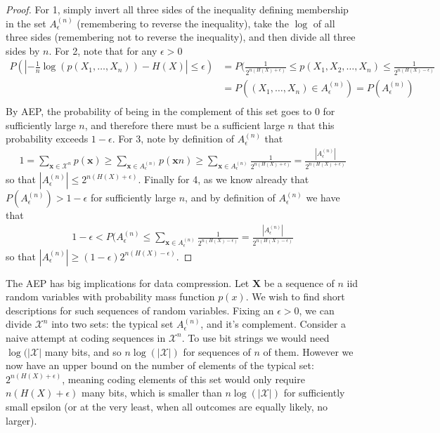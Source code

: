 \begin{proof}
	For 1, simply invert all three sides of the inequality defining membership in the set $A^{(n)}_{\epsilon}$ (remembering to reverse the inequality), take the $\log$ of all three sides (remembering not to reverse the inequality), and then divide all three sides by $n$. For 2, note that for any $\epsilon > 0$
	\begin{align}
		P(|-\frac{1}{n}\log(p(X_1,\ldots,X_n)) - H(X)| \leq \epsilon) &= P(\frac{1}{2^{n(H(X)+\epsilon)}} \leq p(X_1,X_2,\ldots,X_n) \leq \frac{1}{2^{n(H(X)-\epsilon)}} \\
		&= P((X_1,\ldots,X_n) \in A^{(n)}_{\epsilon}) = P(A^{(n)}_{\epsilon}) \\
	\end{align}
	By AEP, the probability of being in the complement of this set goes to $0$ for sufficiently large $n$, and therefore there must be a sufficient large $n$ that this probability exceeds $1-\epsilon$. For 3, note by definition of $A^{(n)}_{\epsilon}$ that 
	\begin{align}
		1 = \sum_{\bm{x} \in \mathcal{X}^n} p(\bm{x}) \geq \sum_{\bm{x} \in A^{(n)}_{\epsilon}} p(\bm{x}n) \geq \sum_{\bm{x} \in A^{(n)}_{\epsilon}} \frac{1}{2^{n(H(X)+\epsilon)}} = \frac{|A^{(n)}_{\epsilon}|}{2^{n(H(X)+\epsilon)}}
	\end{align}
	so that $|A^{(n)}_{\epsilon}| \leq 2^{n(H(X)+\epsilon)}$. Finally for 4, as we know already that $P(A_{\epsilon}^{(n)}) > 1-\epsilon$ for sufficiently large $n$, and by definition of  $A_{\epsilon}^{(n)}$ we have that
	\begin{align}
		1-\epsilon < P(A^{(n)}_{\epsilon}  \leq \sum_{\bm{x} \in A^{(n)}_{\epsilon}} \frac{1}{2^{n(H(X)-\epsilon)}} = \frac{|A^{(n)}_{\epsilon}|}{2^{n(H(X)-\epsilon)}}
	\end{align}
so that $|A^{(n)}_{\epsilon}| \geq (1-\epsilon)2^{n(H(X)-\epsilon)}$.
\end{proof}
The AEP has big implications for data compression. Let $\bm{X}$ be a sequence of $n$ iid random variables with probability mass function $p(x)$. We wish to find short descriptions for such sequences of random variables. Fixing an $\epsilon > 0$, we can divide $\mathcal{X}^n$ into two sets: the typical set $A^{(n)}_{\epsilon}$, and it's complement. Consider a naive attempt at coding sequences in $\mathcal{X}^n$. To use bit strings we would need $\log(|\mathcal{X}|$ many bits, and so $n\log(|\mathcal{X}|)$ for sequences of $n$ of them. However we now have an upper bound on the number of elements of the typical set: $2^{n(H(X)+\epsilon)}$, meaning coding elements of this set would only require $n(H(X)+\epsilon)$ many bits, which is smaller than $n\log(|\mathcal{X}|)$ for sufficiently small epsilon (or at the very least, when all outcomes are equally likely, no larger). \par 
